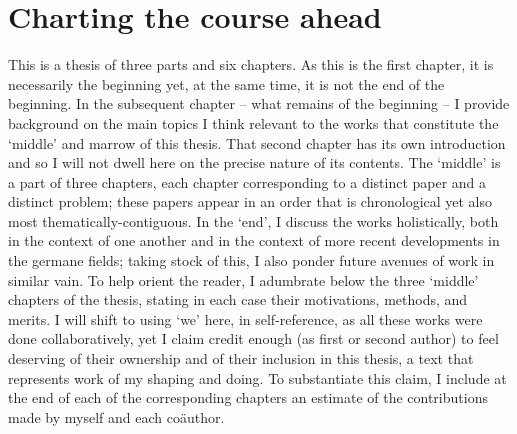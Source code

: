\section*{Charting the course ahead}\label{sec:charting}
%
This is a thesis of three parts and six chapters. 
%
As this is the first chapter, it is necessarily the beginning yet, at the same time, it is not
the end of the beginning. 
%
In the subsequent chapter -- what remains of the beginning -- I provide background on the main
topics I think relevant to the works that constitute the `middle' and marrow of this thesis.
%
That second chapter has its own introduction and so I will not dwell here on the precise nature of
its contents.
%
The `middle' is a part of three chapters, each chapter corresponding to a distinct paper and a
distinct problem; these papers appear in an order that is chronological yet also most
thematically-contiguous.
%
In the `end', I discuss the works holistically, both in the context of one another and in the
context of more recent developments in the germane fields; taking stock of this, I also ponder
future avenues of work in similar vain.
%
To help orient the reader, I adumbrate below the three `middle' chapters of the thesis, stating
in each case their motivations, methods, and merits. 
%
I will shift to using `we' here, in self-reference, as all these works were done collaboratively,
yet I claim credit enough (as first or second author) to feel deserving of their ownership and of
their inclusion in this thesis, a text that represents work of my shaping and doing.
%
To substantiate this claim, I include at the end of each of the corresponding chapters an estimate
of the contributions made by myself and each co{\"a}uthor.
%
